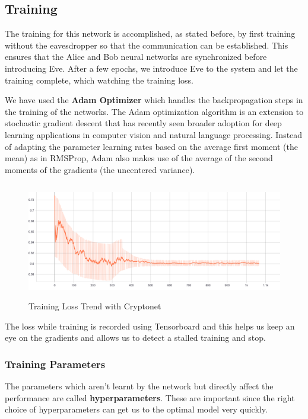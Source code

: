\documentclass[a4paper]{article}
\begin{document}
    \subsection{Training}
    The training for this network is accomplished, as stated before, by first training without
    the eavesdropper so that the communication can be established. This ensures that the Alice and
    Bob neural networks are synchronized before introducing Eve. After a few epochs, we introduce
    Eve to the system and let the training complete, which watching the training loss.

    We have used the {\bfseries Adam Optimizer} which handles the backpropagation steps in the
    training of the networks. The Adam optimization algorithm is an extension to stochastic 
    gradient descent that has recently seen broader adoption for deep learning applications 
    in computer vision and natural language processing. Instead of adapting the parameter 
    learning rates based on the average first moment (the mean) as in RMSProp, Adam also 
    makes use of the average of the second moments of the gradients (the uncentered variance).

    \begin{figure}[H]
      \centering
      \includegraphics[height=2in]{../../models/cryptonet/graphs/TrainingLoss[S].png}
      \caption{Training Loss Trend with Cryptonet}
      \label{fig:trn_crnet}
    \end{figure} 

    The loss while training is recorded using Tensorboard and this helps us keep an eye on the
    gradients and allows us to detect a stalled training and stop.

      \subsubsection{Training Parameters}
      The parameters which aren't learnt by the network but directly affect the performance are
      called {\bfseries hyperparameters}. These are important since the right choice of hyperparameters
      can get us to the optimal model very quickly.
\end{document}

